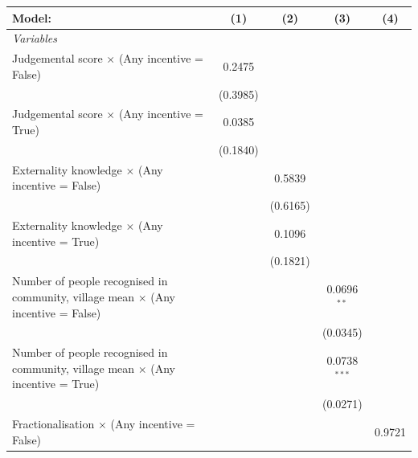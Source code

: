 
\begingroup
\centering
\begin{tabular}{lcccc}
   \tabularnewline \midrule \midrule
   Model:                                                                                   & (1)      & (2)      & (3)            & (4)\\  
   \midrule
   \emph{Variables}\\
   Judgemental score $\times$ (Any incentive = False)                                       & 0.2475   &          &                &   \\   
                                                                                            & (0.3985) &          &                &   \\   
   Judgemental score $\times$ (Any incentive = True)                                        & 0.0385   &          &                &   \\   
                                                                                            & (0.1840) &          &                &   \\   
   Externality knowledge $\times$ (Any incentive = False)                                   &          & 0.5839   &                &   \\   
                                                                                            &          & (0.6165) &                &   \\   
   Externality knowledge $\times$ (Any incentive = True)                                    &          & 0.1096   &                &   \\   
                                                                                            &          & (0.1821) &                &   \\   
   Number of people recognised in community, village mean $\times$ (Any incentive = False)  &          &          & 0.0696$^{**}$  &   \\   
                                                                                            &          &          & (0.0345)       &   \\   
   Number of people recognised in community, village mean $\times$ (Any incentive = True)   &          &          & 0.0738$^{***}$ &   \\   
                                                                                            &          &          & (0.0271)       &   \\   
   Fractionalisation $\times$ (Any incentive = False)                                       &          &          &                & 0.9721\\   

\end{tabular}

